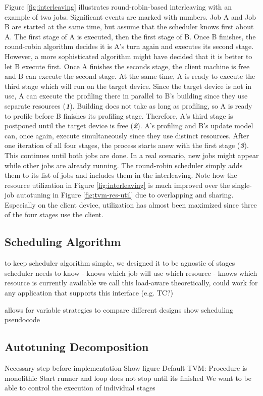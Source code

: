 Figure \ref{fig:interleaving} illustrates round-robin-based interleaving with an example of two jobs. Significant events are marked with numbers. Job A and Job B are started at the same time, but assume that the scheduler knows first about A. The first stage of A is executed, then the first stage of B. Once B finishes, the round-robin algorithm decides it is A's turn again and executes its second stage. However, a more sophisticated algorithm might have decided that it is better to let B execute first. Once A finishes the seconds stage, the client machine is free and B can execute the second stage. At the same time, A is ready to execute the third stage which will run on the target device. Since the target device is not in use, A can execute the profiling there in parallel to B's building since they use separate resources (\textbf{\textit{1}}). Building does not take as long as profiling, so A is ready to profile before B finishes its profiling stage. Therefore, A's third stage is postponed until the target device is free (\textbf{\textit{2}}). A's profiling and B's update model can, once again, execute simultaneously since they use distinct resources. After one iteration of all four stages, the process starts anew with the first stage (\textbf{\textit{3}}). This continues until both jobs are done. In a real scenario, new jobs might appear while other jobs are already running. The round-robin scheduler simply adds them to its list of jobs and includes them in the interleaving. Note how the resource utilization in Figure \ref{fig:interleaving} is much improved over the single-job autotuning in Figure \ref{fig:tvm-res-util} due to overlapping and sharing. Especially on the client device, utilization has almost been maximized since three of the four stages use the client.

\subsection{Scheduling Algorithm}
to keep scheduler algorithm simple, we designed it to be agnostic of stages
scheduler needs to know
- knows which job will use which resource
- knows which resource is currently available
we call this load-aware
theoretically, could work for any application that supports this interface (e.g. TC?)

allows for variable strategies to compare different designs
show scheduling pseudocode

\subsection{Autotuning Decomposition}
Necessary step before implementation
Show figure
Default TVM:
Procedure is monolithic
Start runner and loop does not stop until its finished
We want to be able to control the execution of individual stages

